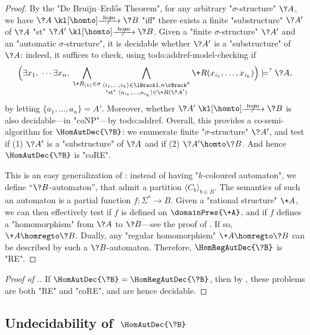 \begin{proof}
	By the "De Bruijn–Erdős Theorem", for any arbitrary "$\sigma$-structure" $\?A$,
	we have $\?A \nothomto \?B$ "iff" there exists a finite "substructure" $\?A'$ of $\?A$
	"st" $\?A' \nothomto \?B$.
	Given a "finite $\sigma$-structure" $\?A'$ and an "automatic $\sigma$-structure",
	it is decidable whether $\?A'$ is a "substructure" of $\?A$: indeed, it suffices
	to check, using todo:addref-model-checking if
	\[
		\Bigl(
			\exists x_1,\; \cdots \exists x_n,\;
			\bigwedge_{\+R_{(k)} \in \sigma} \bigwedge_{\substack{\tup{i_1,\hdots,i_k} \in \lBrack 1,n\rBrack^k\\\text{"st" }\tup{a_{i_1},\hdots,a_{i_k}} \in \+R(\?A')}}
			\+R(x_{i_1},\hdots,x_{i_k})
		\Bigr)
		\models^{?} \?A,
	\]
	by letting $\{a_1,\hdots,a_n\} = A'$. 
	Moreover, whether $\?A' \nothomto \?B$ is also decidable---in "coNP"---by todo:addref.
	Overall, this provides a co-semi-algorithm for $\HomAutDec{\?B}$: we enumerate finite
	"$\sigma$-structure" $\?A'$, and test if (1) $\?A'$ is a "substructure" of $\?A$ and if (2)
	$\?A' \homto \?B$. And hence $\HomAutDec{\?B}$ is "coRE".

	 This is an easy generalization of
	: instead of having "$k$-coloured automaton", we define
	``$\?B$-automaton'', that admit a partition $\langle C_{b} \rangle_{b \in B}$.
	The semantics of such an automaton is a partial function $f\colon \Sigma^* \to B$. 
	Given a "rational structure" $\+A$, we can then effectively test if $f$ is defined on $\domainPres{\+A}$, and if $f$ defines a "homomorphism" from $\?A$ to $\?B$---see
	the proof of . If so, $\+A \homregto \?B$. Dually, any "regular homomorphism" $\+A \homregto \?B$ can be described by such a $\?B$-automaton.
	Therefore, $\HomRegAutDec{\?B}$ is "RE".
\end{proof}

\begin{proof}[Proof of .]
	If $\HomAutDec{\?B} = \HomRegAutDec{\?B}$, then by ,
	these problems are both "RE" and "coRE", and are hence decidable.
\end{proof}

\subsection{\AP\label{sec:undecidability-hom}%
	Undecidability of \,$\HomAutDec{\?B}$}

